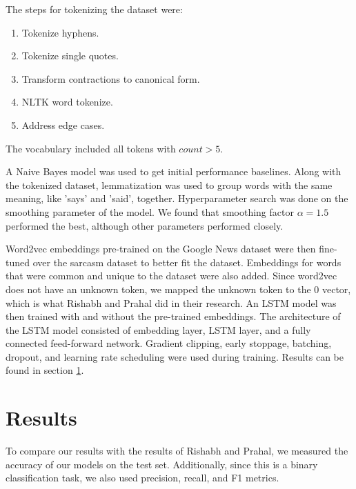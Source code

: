 \documentclass[11pt]{article}
\begin{document}
The steps for tokenizing the dataset were:
\begin{enumerate}
    \item Tokenize hyphens.
    \item Tokenize single quotes.
    \item Transform contractions to canonical form.
    \item NLTK word tokenize.
    \item Address edge cases.
\end{enumerate}
The vocabulary included all tokens with $ count > 5 $.

A Naive Bayes model was used to get initial performance baselines.
Along with the tokenized dataset,
lemmatization was used to group words with the same meaning,
like 'says' and 'said', together.
Hyperparameter search was done on the smoothing parameter of the model.
We found that smoothing factor $ \alpha = 1.5 $ performed the best,
although other parameters performed closely.

Word2vec embeddings pre-trained on the Google News dataset
were then fine-tuned over the sarcasm dataset to better fit the dataset. \cite{google-word2vec}
Embeddings for words that were common and unique to the dataset were also added.
Since word2vec does not have an unknown token,
we mapped the unknown token to the 0 vector,
which is what Rishabh and Prahal did in their research. \cite{misra2023Sarcasm}
An LSTM model was then trained with and without the pre-trained embeddings.
The architecture of the LSTM model consisted of
embedding layer, LSTM layer, and a fully connected feed-forward network.
Gradient clipping, early stoppage, batching, dropout,
and learning rate scheduling were used during training.
Results can be found in section \ref{sec:res}.


\section{Results}\label{sec:res}

To compare our results with the results of Rishabh and Prahal,
we measured the accuracy of our models on the test set. \cite{misra2023Sarcasm}
Additionally, since this is a binary classification task,
we also used precision, recall, and F1 metrics.

\end{document}
